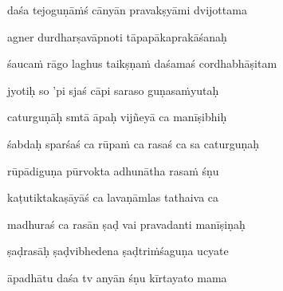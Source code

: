 daśa tejoguṇā\.mś cānyān pravakṣyāmi dvijottama \veg\dontdisplaylinenum

agner durdharṣavāpnoti tāpapākaprakāśanaḥ\thinspace{\dandab} \dontdisplaylinenum

śauca\.m rāgo laghus taikṣṇa\.m daśamaś cordhabhāṣitam \veg\dontdisplaylinenum


jyotiḥ so 'pi sjaś cāpi saraso guṇasa\.myutaḥ\thinspace{\dandab} \dontdisplaylinenum

caturguṇāḥ smtā āpaḥ vijñeyā ca manīṣibhiḥ \veg\dontdisplaylinenum
            \var{\vd \om\ \msCa\msNa}%

śabdaḥ sparśaś ca rūpa\.m ca rasaś ca sa caturguṇaḥ\thinspace{\dandab} \dontdisplaylinenum

rūpādiguṇa pūrvokta adhunātha rasa\.m śṇu \veg\dontdisplaylinenum

kaṭutiktakaṣāyāś ca lavaṇāmlas tathaiva ca\thinspace{\dandab} \dontdisplaylinenum

madhuraś ca rasān ṣaḍ vai pravadanti manīṣiṇaḥ \veg\dontdisplaylinenum

ṣaḍrasāḥ ṣaḍvibhedena ṣaḍtri\.mśaguṇa ucyate\thinspace{\dandab} \dontdisplaylinenum

āpadhātu daśa tv anyān śṇu kīrtayato mama \veg\dontdisplaylinenum

